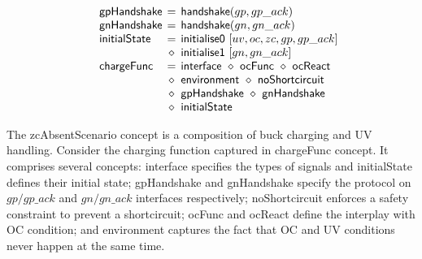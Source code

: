 \documentclass[british, journal]{IEEEtran}
\begin{document}
\[\begin{array}{lcl}
~~~~\mathsf{gpHandshake}&\hspace{-2mm}=&\hspace{-2mm}\mathsf{handshake}(gp,gp\_ack)\\

~~~~\mathsf{gnHandshake}&\hspace{-2mm}=&\hspace{-2mm}\mathsf{handshake}(gn,gn\_ack)\\

~~~~\mathsf{initialState}&\hspace{-2mm}=&\hspace{-2mm}\mathsf{initialise0}~[uv,oc,zc,gp,gp\_ack]\\
~&\hspace{-2mm}\diamond&\hspace{-2mm}\mathsf{initialise1}~[gn,gn\_ack]\\

~~~~\mathsf{chargeFunc}&\hspace{-2mm}=&\hspace{-2mm}\mathsf{interface}~\diamond~\mathsf{ocFunc}~\diamond~\mathsf{ocReact}\\
~&\hspace{-2mm}\diamond&\hspace{-2mm}\mathsf{environment}~\diamond~\mathsf{noShortcircuit}\\
~&\hspace{-2mm}\diamond&\hspace{-2mm}\mathsf{gpHandshake}~\diamond~\mathsf{gnHandshake}\\
~&\hspace{-2mm}\diamond&\hspace{-2mm}\mathsf{initialState}

\end{array}
\]

The \textsf{zcAbsentScenario} concept is a composition of buck charging and UV
handling.
Consider the charging function captured in \textsf{chargeFunc} concept.
It comprises several concepts: \textsf{interface} specifies the types
of signals and \textsf{initialState} defines their initial state;
\textsf{gpHandshake} and \textsf{gnHandshake} specify the protocol on
$gp/gp\_ack$
and $gn/gn\_ack$ interfaces respectively;
\textsf{noShortcircuit} enforces a safety constraint to prevent a shortcircuit;
\textsf{ocFunc} and \textsf{ocReact} define the interplay with OC condition;
and \textsf{environment} captures the fact that OC and UV conditions never
happen at the same time.
\end{document}
